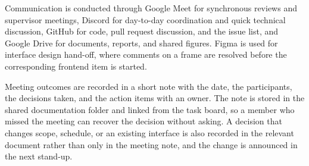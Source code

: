 Communication is conducted through Google Meet for synchronous reviews and supervisor meetings, Discord for day-to-day coordination and quick technical discussion, GitHub for code, pull request discussion, and the issue list, and Google Drive for documents, reports, and shared figures. Figma is used for interface design hand-off, where comments on a frame are resolved before the corresponding frontend item is started.

Meeting outcomes are recorded in a short note with the date, the participants, the decisions taken, and the action items with an owner. The note is stored in the shared documentation folder and linked from the task board, so a member who missed the meeting can recover the decision without asking. A decision that changes scope, schedule, or an existing interface is also recorded in the relevant document rather than only in the meeting note, and the change is announced in the next stand-up.
